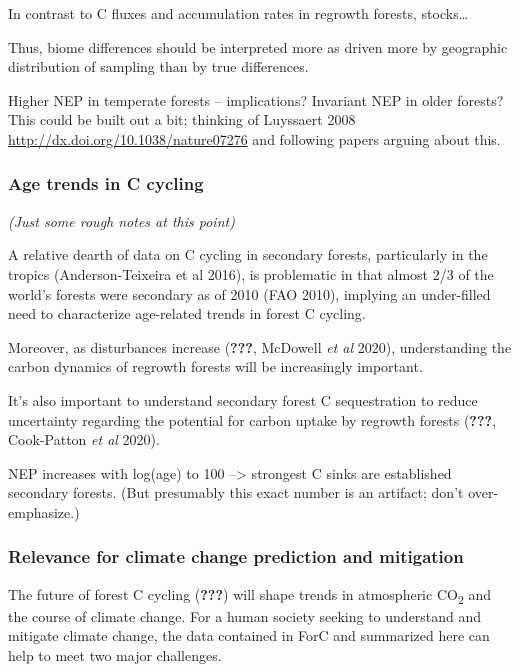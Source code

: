 \documentclass[
]{article}
\begin{document}
In contrast to C fluxes and accumulation rates in regrowth forests,
stocks\ldots{}

Thus, biome differences should be interpreted more as driven more by
geographic distribution of sampling than by true differences.

Higher NEP in temperate forests -- implications? Invariant NEP in older
forests? This could be built out a bit; thinking of Luyssaert 2008
\url{http://dx.doi.org/10.1038/nature07276} and following papers arguing
about this.

\hypertarget{age-trends-in-c-cycling}{%
\subsubsection{Age trends in C cycling}\label{age-trends-in-c-cycling}}

\emph{(Just some rough notes at this point)}

A relative dearth of data on C cycling in secondary forests,
particularly in the tropics (Anderson-Teixeira et al 2016), is
problematic in that almost 2/3 of the world's forests were secondary as
of 2010 (FAO 2010), implying an under-filled need to characterize
age-related trends in forest C cycling.

Moreover, as disturbances increase ({\textbf{???}}, McDowell \emph{et
al} 2020), understanding the carbon dynamics of regrowth forests will be
increasingly important.

It's also important to understand secondary forest C sequestration to
reduce uncertainty regarding the potential for carbon uptake by regrowth
forests ({\textbf{???}}, Cook-Patton \emph{et al} 2020).

NEP increases with log(age) to 100 --\textgreater{} strongest C sinks
are established secondary forests. (But presumably this exact number is
an artifact; don't over-emphasize.)

\hypertarget{relevance-for-climate-change-prediction-and-mitigation}{%
\subsubsection{Relevance for climate change prediction and
mitigation}\label{relevance-for-climate-change-prediction-and-mitigation}}

The future of forest C cycling ({\textbf{???}}) will shape trends in
atmospheric CO\textsubscript{2} and the course of climate change. For a
human society seeking to understand and mitigate climate change, the
data contained in ForC and summarized here can help to meet two major
challenges.
\end{document}
